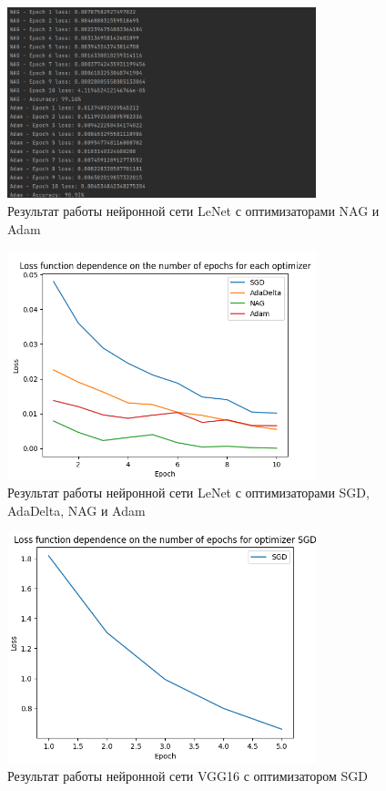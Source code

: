 \documentclass[a4paper, 14pt]{extarticle}
\begin{document}
\begin{figure}[!htb]
	\centering
	\includegraphics[width=0.8\textwidth]{img2}
\caption{Результат работы нейронной сети LeNet с оптимизаторами NAG и Adam}
\label{fig:img2}
\end{figure}

\begin{figure}[!htb]
	\centering
	\includegraphics[width=0.8\textwidth]{img3}
\caption{Результат работы нейронной сети LeNet с оптимизаторами SGD, AdaDelta, NAG и Adam}
\label{fig:img3}
\end{figure}

\begin{figure}[!htb]
	\centering
	\includegraphics[width=0.8\textwidth]{img4}
\caption{Результат работы нейронной сети VGG16 с оптимизатором SGD}
\label{fig:img4}
\end{figure}
\end{document}
